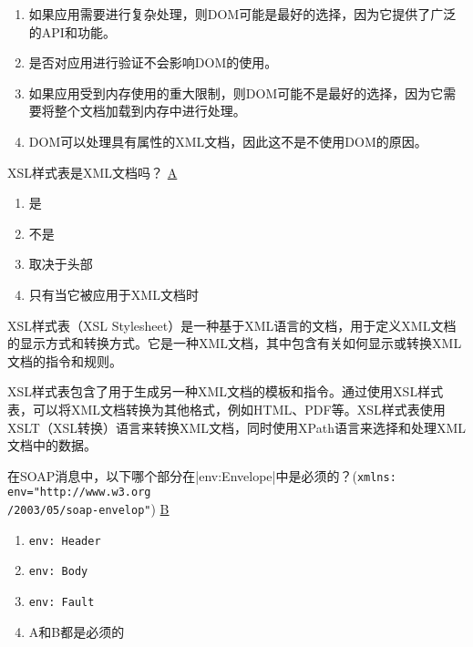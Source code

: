 \begin{solution}
\begin{enumerate}[label=\Alph*.]
    \item 如果应用需要进行复杂处理，则DOM可能是最好的选择，因为它提供了广泛的API和功能。
    \item 是否对应用进行验证不会影响DOM的使用。
    \item 如果应用受到内存使用的重大限制，则DOM可能不是最好的选择，因为它需要将整个文档加载到内存中进行处理。
    \item DOM可以处理具有属性的XML文档，因此这不是不使用DOM的原因。
\end{enumerate}
\end{solution}


\begin{problem}
XSL样式表是XML文档吗？
\uline{A}
\vspace{-0.8em}
\begin{multicols}{2}
    \begin{enumerate}[label=\Alph*.]
        \item 是
        \item 不是
        \item 取决于头部
        \item 只有当它被应用于XML文档时
    \end{enumerate}
\end{multicols}
\vspace{-1em}
\end{problem}

\begin{solution}
XSL样式表（XSL Stylesheet）是一种基于XML语言的文档，用于定义XML文档的显示方式和转换方式。它是一种XML文档，其中包含有关如何显示或转换XML文档的指令和规则。

XSL样式表包含了用于生成另一种XML文档的模板和指令。通过使用XSL样式表，可以将XML文档转换为其他格式，例如HTML、PDF等。XSL样式表使用XSLT（XSL转换）语言来转换XML文档，同时使用XPath语言来选择和处理XML文档中的数据。
\end{solution}


\begin{problem}
在SOAP消息中，以下哪个部分在\sverb|env:Envelope|\;中是必须的？(\verb|xmlns: env="http://www.w3.org| \\\verb|/2003/05/soap-envelop"|)
\uline{B}
\vspace{-0.8em}
\begin{multicols}{4}
    \begin{enumerate}[label=\Alph*.]
        \item \verb|env: Header|
        \item \verb|env: Body|
        \item \verb|env: Fault|
        \item A和B都是必须的
    \end{enumerate}
\end{multicols}
\vspace{-1em}
\end{problem}

